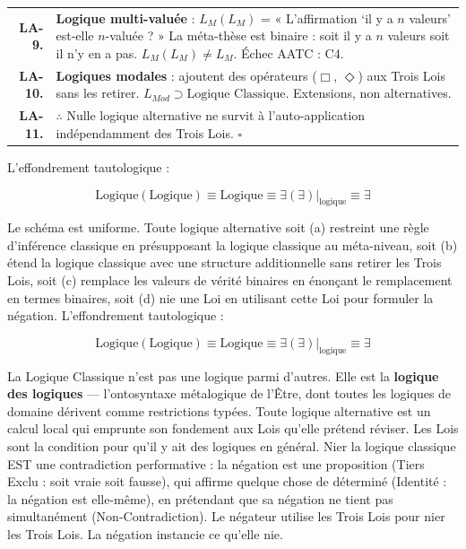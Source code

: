 \documentclass[10pt, openany, oneside]{book}
\begin{document}
{\begin{tabular}{r p{}}
\textbf{LA-9.} & \textbf{Logique multi-valuée} : $L_M(L_M)$ = « L'affirmation `il y a $n$ valeurs' est-elle $n$-valuée ? » La méta-thèse est binaire : soit il y a $n$ valeurs soit il n'y en a pas. $L_M(L_M) \neq L_M$. Échec AATC : C4. \\[0.3em]
\textbf{LA-10.} & \textbf{Logiques modales} : ajoutent des opérateurs ($\Box$, $\Diamond$) aux Trois Lois sans les retirer. $L_{Mod} \supset \text{Logique Classique}$. Extensions, non alternatives. \\[0.3em]
\textbf{LA-11.} & $\therefore$ Nulle logique alternative ne survit à l'auto-application indépendamment des Trois Lois. $\square$ \\[0.3em]
\end{tabular}
}

\vspace{0.8em}

\noindent L'effondrement tautologique :

$$\text{Logique}(\text{Logique}) \equiv \text{Logique} \equiv \exists(\exists)|_{\text{logique}} \equiv \exists$$



\noindent Le schéma est uniforme. Toute logique alternative soit (a) restreint une règle d'inférence classique en présupposant la logique classique au méta-niveau, soit (b) étend la logique classique avec une structure additionnelle sans retirer les Trois Lois, soit (c) remplace les valeurs de vérité binaires en énonçant le remplacement en termes binaires, soit (d) nie une Loi en utilisant cette Loi pour formuler la négation. L'effondrement tautologique :

$$\text{Logique}(\text{Logique}) \equiv \text{Logique} \equiv \exists(\exists)|_{\text{logique}} \equiv \exists$$

La Logique Classique n'est pas une logique parmi d'autres. Elle est la \textbf{logique des logiques} --- l'ontosyntaxe métalogique de l'Être, dont toutes les logiques de domaine dérivent comme restrictions typées. Toute logique alternative est un calcul local qui emprunte son fondement aux Lois qu'elle prétend réviser. Les Lois sont la condition pour qu'il y ait des logiques en général. Nier la logique classique EST une contradiction performative : la négation est une proposition (Tiers Exclu : soit vraie soit fausse), qui affirme quelque chose de déterminé (Identité : la négation est elle-même), en prétendant que sa négation ne tient pas simultanément (Non-Contradiction). Le négateur utilise les Trois Lois pour nier les Trois Lois. La négation instancie ce qu'elle nie.
\end{document}

